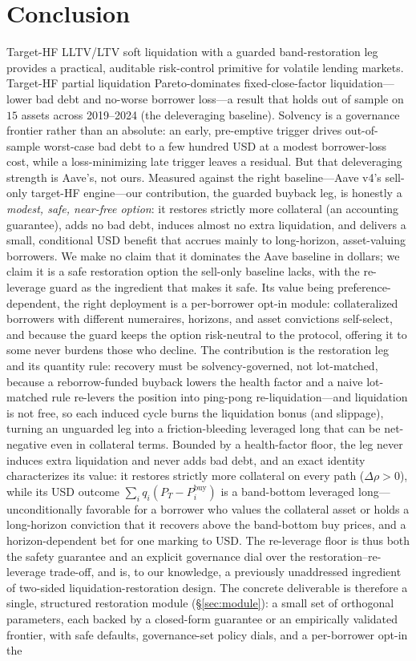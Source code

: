 \documentclass[12pt]{article}
\begin{document}
\section{Conclusion}
Target-HF LLTV/LTV soft liquidation with a guarded band-restoration leg provides a practical, auditable risk-control primitive for volatile lending markets. Target-HF partial liquidation Pareto-dominates fixed-close-factor liquidation---lower bad debt and no-worse borrower loss---a result that holds out of sample on $15$ assets across 2019--2024 (the deleveraging baseline). Solvency is a governance frontier rather than an absolute: an early, pre-emptive trigger drives out-of-sample worst-case bad debt to a few hundred USD at a modest borrower-loss cost, while a loss-minimizing late trigger leaves a residual. But that deleveraging strength is Aave's, not ours. Measured against the right baseline---Aave v4's sell-only target-HF engine---our contribution, the guarded buyback leg, is honestly a \emph{modest, safe, near-free option}: it restores strictly more collateral (an accounting guarantee), adds no bad debt, induces almost no extra liquidation, and delivers a small, conditional USD benefit that accrues mainly to long-horizon, asset-valuing borrowers. We make no claim that it dominates the Aave baseline in dollars; we claim it is a safe restoration option the sell-only baseline lacks, with the re-leverage guard as the ingredient that makes it safe. Its value being preference-dependent, the right deployment is a per-borrower opt-in module: collateralized borrowers with different numeraires, horizons, and asset convictions self-select, and because the guard keeps the option risk-neutral to the protocol, offering it to some never burdens those who decline. The contribution is the restoration leg and its quantity rule: recovery must be solvency-governed, not lot-matched, because a reborrow-funded buyback lowers the health factor and a naive lot-matched rule re-levers the position into ping-pong re-liquidation---and liquidation is not free, so each induced cycle burns the liquidation bonus (and slippage), turning an unguarded leg into a friction-bleeding leveraged long that can be net-negative even in collateral terms. Bounded by a health-factor floor, the leg never induces extra liquidation and never adds bad debt, and an exact identity characterizes its value: it restores strictly more collateral on every path ($\Delta\rho>0$), while its USD outcome $\sum_i q_i(P_T-P_i^{\text{buy}})$ is a band-bottom leveraged long---unconditionally favorable for a borrower who values the collateral asset or holds a long-horizon conviction that it recovers above the band-bottom buy prices, and a horizon-dependent bet for one marking to USD. The re-leverage floor is thus both the safety guarantee and an explicit governance dial over the restoration--re-leverage trade-off, and is, to our knowledge, a previously unaddressed ingredient of two-sided liquidation-restoration design. The concrete deliverable is therefore a single, structured restoration module (\S\ref{sec:module}): a small set of orthogonal parameters, each backed by a closed-form guarantee or an empirically validated frontier, with safe defaults, governance-set policy dials, and a per-borrower opt-in the 
\end{document}
